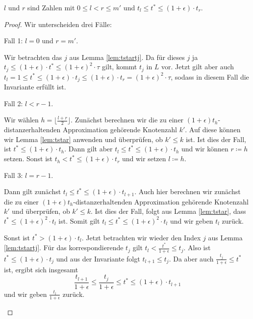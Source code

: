 \begin{lemma}
	\label{lem:invariantmdps}
	$l$ und $r$ sind Zahlen mit $0 \leq l < r \leq m'$ und $t_l \leq t^* \leq (1 + \epsilon)\cdot t_r$.
\end{lemma}
\begin{proof}
	Wir unterscheiden drei Fälle:
	\begin{description}[topsep=0mm, itemsep=0mm]
		\item{Fall 1:} $l = 0$ und $r = m'$.
		
		Wir betrachten das $j$ aus Lemma \ref{lem:tstartj}. 
		Da für dieses $j$ ja $t_j \leq (1 + \epsilon) \cdot t^* \leq (1 + \epsilon)^2 \cdot \tau$ gilt, kommt $t_j$ in $L$ vor. 
		Jetzt gilt aber auch $t_l = 1 
		\leq t^* 
		\leq (1 + \epsilon) \cdot t_j 
		\leq (1 + \epsilon) \cdot t_r 
		= (1 + \epsilon)^2 \cdot \tau$, sodass in diesem Fall die Invariante erfüllt ist.
		
		\item{Fall 2:} 
		$l < r-1$.
		
		Wir wählen $h = \lfloor \frac{l + r}{2} \rfloor$. 
		Zunächst berechnen wir die zu einer $(1 + \epsilon)t_h$-distanzerhaltenden Approximation gehörende Knotenzahl $k'$. 
		Auf diese können wir Lemma \ref{lem:tstar} anwenden und überprüfen, ob $k' \leq k$ ist.
		Ist dies der Fall, ist $t^* \leq (1 + \epsilon) \cdot t_h$. 
		Dann gilt aber $t_l \leq t^* \leq  (1 + \epsilon) \cdot t_h$ und wir können $r \coloneqq h$ setzen. 
		Sonst ist $t_h < t^* \leq (1 + \epsilon)\cdot t_r$ und wir setzen $l \coloneqq h$.
		
		\item{Fall 3:} $l = r - 1$.
		
		Dann gilt zunächst $t_l \leq t^* \leq (1 + \epsilon)\cdot t_{l+1}$. 
		Auch hier berechnen wir zunächst die zu einer $(1 + \epsilon)t_h$-distanzerhaltenden Approximation gehörende Knotenzahl $k'$ und überprüfen, ob $k' \leq k$.
		Ist dies der Fall, folgt aus Lemma \ref{lem:tstar}, dass $t^* \leq (1 + \epsilon)^2 \cdot t_l$ ist. 
		Somit gilt $t_l \leq t^* \leq (1 + \epsilon)^2 \cdot t_l$ und wir geben $t_l$ zurück.
		
		Sonst ist $t^* > (1 + \epsilon)\cdot t_l$. 
		Jetzt betrachten wir wieder den Index $j$ aus Lemma \ref{lem:tstartj}. 
		Für das korrespondierende $t_j$ gilt $t_l < \frac{t^*}{1 + \epsilon} \leq t_j$. Also ist $t^* \leq (1 + \epsilon) \cdot t_j$ und aus der Invariante folgt $t_{l+1} \leq t_j$.
		Da aber auch $\frac{t_j}{1 + \epsilon} \leq t^*$ ist, ergibt sich insgesamt 
		\[
		\frac{t_{l+1}}{1 + \epsilon} 
		\leq \frac{t_j}{1 + \epsilon} 
		\leq t^* 
		\leq (1 + \epsilon) \cdot t_{l+1}
		\]
		und wir geben $\frac{t_l}{1 + \epsilon}$ zurück.
	\end{description}
\end{proof}

